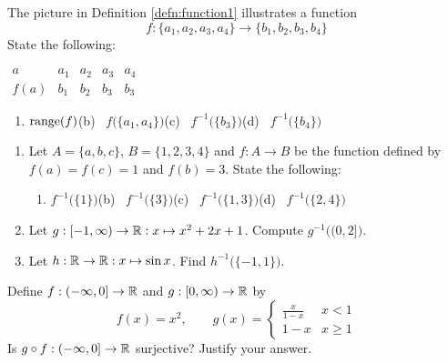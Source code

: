 \begin{exercises}
\begin{enumerate}
		
		\begin{minipage}[t]{0.6\linewidth}\vspace{0pt}
			\item The picture in Definition \ref{defn:function1} illustrates a function
			\[
				f:\{a_1,a_2,a_3,a_4\}\to\{b_1,b_2,b_3,b_4\}
			\]
			State the following:\vspace{-2pt}
		\end{minipage}
		\hfill
		\begin{minipage}[t]{0.39\linewidth}\vspace{0pt}
			\flushright
			$\begin{array}{c|cccc}
	   		a&a_1&a_2&a_3&a_4\\\hline
	   		f(a)&b_1&b_2&b_3&b_3
	  	\end{array}$
		\end{minipage}	
		\begin{enumerate}
		  \item $\operatorname{range}(f)$\qquad\qquad (b) \ $f\bigl(\{a_1,a_4\}\bigr)$\qquad\qquad (c) \ $f^{-1}\bigl(\{b_3\}\bigr)$\qquad\qquad (d) \ $f^{-1}\bigl(\{b_4\}\bigr)$
		\end{enumerate}
	
	
		\item\begin{enumerate}
	    \item Let $A=\{a,b,c\}$, $B=\{1,2,3,4\}$ and $f:A\to B$ be the function defined by $f(a)=f(c)=1$ and $f(b)=3$. State the following:
	    	\begin{enumerate}
	    	  \item $f^{-1}\bigl(\{1\}\bigr)$\qquad\qquad (b) \ $f^{-1}\bigl(\{3\}\bigr)$\qquad\qquad (c) \ $f^{-1}\bigl(\{1,3\}\bigr)$\qquad\qquad (d) \ $f^{-1}\bigl(\{2,4\}\bigr)$
	    	\end{enumerate} 
	    \item Let $g:[-1,\infty)\to\mathbb{R}:x\mapsto x^2+2x+1$. Compute $g^{-1}\bigl((0,2]\bigr)$. 
	    \item Let $h:\mathbb{R}\to\mathbb{R}:x\mapsto \sin x$. Find $h^{-1}\bigl(\{-1,1\}\bigr)$. 
		\end{enumerate}
	
		
	  \item Define $f:(-\infty,0]\to\mathbb{R}$ and $g:[0,\infty)\to\mathbb{R}$ by
	  \[
	  	f(x)=x^2,\qquad g(x)=
	  	\begin{cases}
	  		\frac{x}{1-x}&x<1\\
	  		1-x&x\ge 1
	  	\end{cases}
	  \]
	  Is $g\circ f:(-\infty,0]\to\mathbb{R}$ surjective? Justify your answer.
		  

\end{enumerate}
\end{exercises}
